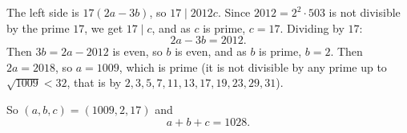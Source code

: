 The left side is $17(2a-3b)$, so $17\mid2012c$. Since $2012=2^2\cdot503$ is not divisible by the prime $17$, we get $17\mid c$, and as $c$ is prime, $c=17$. Dividing by $17$:
\[
2a-3b=2012 .
\]
Then $3b=2a-2012$ is even, so $b$ is even, and as $b$ is prime, $b=2$. Then $2a=2018$, so $a=1009$, which is prime (it is not divisible by any prime up to $\sqrt{1009}<32$, that is by $2,3,5,7,11,13,17,19,23,29,31$).

So $(a,b,c)=(1009,2,17)$ and
\[
a+b+c=\boxed{1028}.
\]
